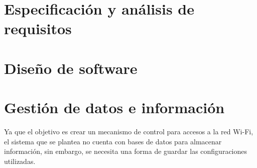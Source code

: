 \documentclass[12pt]{article}
\begin{document}
\section{Especificación y análisis de requisitos}

\section{Diseño de software}

\section{Gestión de datos e información}
    Ya que el objetivo es crear un mecanismo de control para accesos a la red Wi-Fi, el sistema que se plantea no cuenta con bases de datos para almacenar información, sin embargo, se necesita una forma de guardar las configuraciones utilizadas.
    
\end{document}
